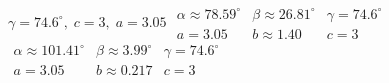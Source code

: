 { $\gamma = 74.6^{\circ}, \; c = 3, \; a = 3.05$}
{$\begin{array}{lll}\alpha \approx 78.59^{\circ} & \beta \approx 26.81^{\circ} & \gamma = 74.6^{\circ} \\a = 3.05 & b \approx 1.40 & c = 3 \end{array}$\\$\begin{array}{lll}\alpha \approx 101.41^{\circ} & \beta \approx 3.99^{\circ} & \gamma = 74.6^{\circ} \\a = 3.05 & b \approx 0.217 & c = 3 \end{array}$}
